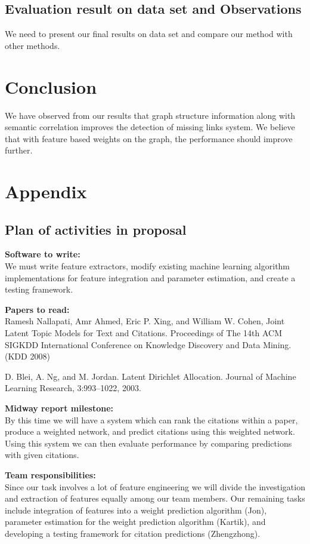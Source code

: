 \documentclass{article} %
\begin{document}
\subsection{Evaluation result on data set and Observations}
We need to present our final results on data set and compare our method with other methods.
\section{Conclusion}
We have observed from our results that graph structure information along with semantic correlation improves the detection of missing links system. We believe that with feature based weights on the graph, the performance should improve further.


\nocite{*}

\newpage
\section{Appendix}
\subsection{Plan of activities in proposal}
\textbf{Software to write:}\\
We must write feature extractors, modify existing machine learning algorithm implementations
for feature integration and parameter estimation, and create a testing framework.

\textbf{Papers to read:}\\
Ramesh Nallapati, Amr Ahmed, Eric P. Xing, and William W. Cohen, Joint Latent Topic Models
for Text and Citations. Proceedings of The 14th ACM SIGKDD International Conference on
Knowledge Discovery and Data Mining. (KDD 2008)

D. Blei, A. Ng, and M. Jordan. Latent Dirichlet Allocation. Journal of Machine Learning
Research, 3:993–1022, 2003.

\textbf{Midway report milestone:}\\
By this time we will have a system which can rank the citations within a paper, produce a
weighted network, and predict citations using this weighted network. Using this system we can
then evaluate performance by comparing predictions with given citations.

\textbf{Team responsibilities:}\\
Since our task involves a lot of feature engineering we will divide the investigation and
extraction of features equally among our team members. Our remaining tasks include integration
of features into a weight prediction algorithm (Jon), parameter estimation for the weight
prediction algorithm (Kartik), and developing a testing framework for citation predictions
(Zhengzhong).
\end{document}
